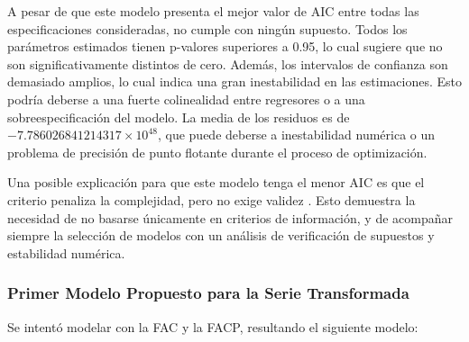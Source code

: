 \documentclass[12pt,letterpaper]{article}   %
\begin{document}
A pesar de que este modelo presenta el mejor valor de AIC entre todas las especificaciones consideradas, no cumple con ningún supuesto. Todos los parámetros estimados tienen p-valores superiores a 0.95, lo cual sugiere que no son significativamente distintos de cero. Además, los intervalos de confianza son demasiado amplios, lo cual indica una gran inestabilidad en las estimaciones. Esto podría deberse a una fuerte colinealidad entre regresores o a una sobreespecificación del modelo. La media de los residuos es de $-7.786026841214317\times10^{48}$, que puede deberse a inestabilidad numérica o un problema de precisión de punto flotante durante el proceso de optimización.

Una posible explicación para que este modelo tenga el menor AIC es que el criterio penaliza la complejidad, pero no exige validez . Esto demuestra la necesidad de no basarse únicamente en criterios de información, y de acompañar siempre la selección de modelos con un análisis de verificación de supuestos y estabilidad numérica.






















\newpage

\subsubsection{Primer Modelo Propuesto para la Serie Transformada}

Se intentó modelar con la FAC y la FACP, resultando el siguiente modelo:
\end{document}
